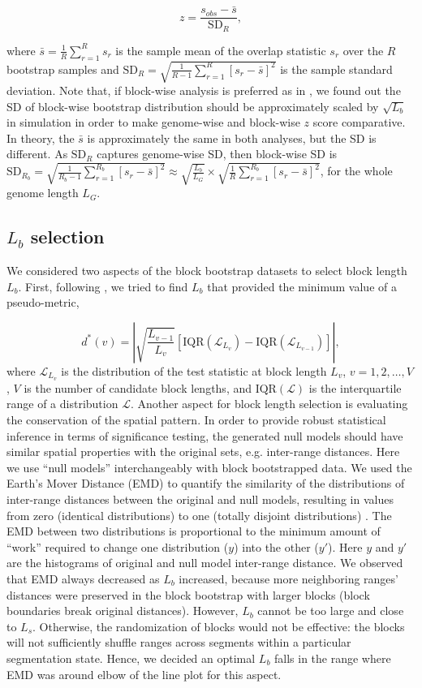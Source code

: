 \documentclass{article}
\begin{document}
$$ z = \frac{s_{obs} - \bar{s}}{ \text{SD}_R },$$

where
$\bar{s} = \frac{1}{R} \sum_{r=1}^R s_r$
is the sample mean of the overlap statistic $s_r$ over the $R$
bootstrap samples and 
$\text{SD}_R = \sqrt{\frac{1}{R-1} \sum_{r=1}^R [s_r - \bar{s}]^2}$ is
the sample standard deviation. 
Note that, if block-wise analysis is preferred as in
\citet{bickel2010subsampling}, we found out the SD of block-wise
bootstrap distribution should be approximately scaled by $\sqrt{L_b}$
in simulation in order to make genome-wise and block-wise $z$ score
comparative. In theory, the $\bar{s}$ is approximately the same in
both analyses, but the SD is different. As $\text{SD}_R$ captures
genome-wise SD, then block-wise SD is
$\text{SD}_{R_b} = \sqrt{\frac{1}{R_b-1} \sum_{r=1}^{R_b} [s_r - \bar{s}]^2} \approx \sqrt{\frac{L_b}{L_G}} \times \sqrt{\frac{1}{R}\sum_{r=1}^{R_b} [s_r - \bar{s}]^2}$,
for the whole genome length $L_G$.

\subsection{$L_b$ selection}\label{sec:length}

We considered two aspects of the block bootstrap datasets to select
block length $L_b$.
First, following \citet{bickel2010subsampling}, we tried to find $L_b$
that provided the minimum value of a pseudo-metric,

$$ d^*(v)= \left| \sqrt{\frac{L_{v-1}}{L_v}} [\text{IQR}(\mathcal{L}_{L_v})-\text{IQR}(\mathcal{L}_{L_{v-1}})] \right|,$$
where $\mathcal{L}_{L_v}$ is the distribution of the test statistic at
block length $L_v$, $v = 1,2,\dots,V$, $V$ is the number of candidate
block lengths, and $\text{IQR}(\mathcal{L})$ is the interquartile
range of a distribution $\mathcal{L}$.
Another aspect for block length selection is evaluating the
conservation of the spatial pattern. In order to provide robust
statistical inference in terms of significance testing,
the generated null models should have
similar spatial properties with 
the original sets, e.g. inter-range distances. Here we use
``null models'' interchangeably with block bootstrapped data.
We used the Earth's Mover
Distance (EMD) to quantify the similarity of the distributions of
inter-range distances between the original and null models, resulting 
in values from zero (identical distributions) to one (totally disjoint
distributions) \citep{emd}.
The EMD between two distributions is proportional to
the minimum amount of ``work'' required to change one distribution ($y$)
into the other ($y'$). Here $y$ and $y'$ are the histograms of
original and null model inter-range distance.
We observed that EMD always decreased as $L_b$ increased, because more
neighboring ranges' distances were preserved in the
block bootstrap with larger blocks (block boundaries break original
distances).
However, $L_b$ cannot be too large and close to $L_s$.
Otherwise, the randomization of blocks would not
be effective: the blocks will not sufficiently shuffle ranges across
segments within a particular segmentation state.
Hence, we decided an optimal $L_b$ falls in the range where EMD
was around elbow of the line plot for this aspect. 
\end{document}
